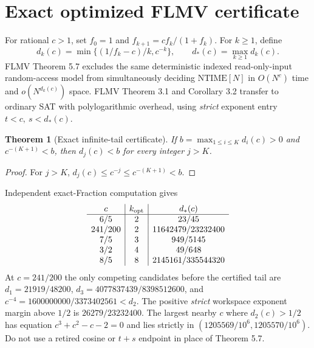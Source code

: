 \documentclass[10pt]{article}
\newtheorem{theorem}{Theorem}
\begin{document}
\section{Exact optimized FLMV certificate}
For rational $c>1$, set $f_0=1$ and $f_{k+1}=cf_k/(1+f_k)$. For $k\ge1$, define
\[
d_k(c)=\min\{(1/f_k-c)/k,c^{-k}\},\qquad d_*(c)=\max_{k\ge1}d_k(c).
\]
FLMV Theorem 5.7 excludes the same deterministic indexed read-only-input random-access model from simultaneously deciding $\mathrm{NTIME}[N]$ in $O(N^c)$ time and $o(N^{d_k(c)})$ space. FLMV Theorem 3.1 and Corollary 3.2 transfer to ordinary SAT with polylogarithmic overhead, using \emph{strict} exponent entry $t<c,\ s<d_*(c)$.
\begin{theorem}[Exact infinite-tail certificate]
If $b=\max_{1\le i\le K}d_i(c)>0$ and $c^{-(K+1)}<b$, then $d_j(c)<b$ for every integer $j>K$.
\end{theorem}
\begin{proof}For $j>K$, $d_j(c)\le c^{-j}\le c^{-(K+1)}<b$.\end{proof}
Independent exact-Fraction computation gives
\[
\begin{array}{c|c|c}
 c&k_{\rm opt}&d_*(c)\\\hline
 6/5&2&23/45\\
 241/200&2&11642479/23232400\\
 7/5&3&949/5145\\
 3/2&4&49/648\\
 8/5&8&2145161/335544320
\end{array}
\]
At $c=241/200$ the only competing candidates before the certified tail are $d_1=21919/48200$, $d_3=4077837439/8398512600$, and $c^{-4}=1600000000/3373402561<d_2$. The positive \emph{strict} workspace exponent margin above $1/2$ is $26279/23232400$. The largest nearby $c$ where $d_2(c)>1/2$ has equation $c^3+c^2-c-2=0$ and lies strictly in $(1205569/10^6,1205570/10^6)$. Do not use a retired cosine or $t+s$ endpoint in place of Theorem 5.7.
\end{document}
